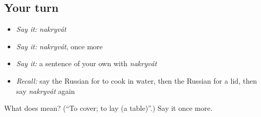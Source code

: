 \subsection*{Your turn}
\begin{itemize}
\raggedright
  \item \emph{Say it:} \emph{nakryvát}
  \item \emph{Say it:} \emph{nakryvát}, once more
  \item \emph{Say it:} a sentence of your own with \emph{nakryvát}
  \item \emph{Recall:} say the Russian for to cook in water, then the Russian for a lid, then say \emph{nakryvát} again
\end{itemize}

\begin{tcolorbox}[breakable,colback=teal!4,colframe=teal!35!black,title={Before you move on}]
What does  mean? (\textquotedblleft{}To cover; to lay (a table)\textquotedblright{}.) Say it once more.
\end{tcolorbox}
